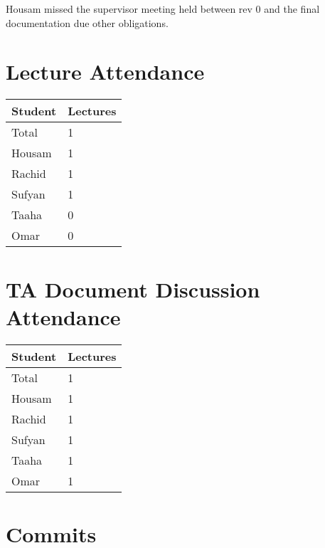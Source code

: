 \documentclass{article}
\begin{document}
Housam missed the supervisor meeting held between rev 0 and the final documentation due other obligations.

\section{Lecture Attendance}


\begin{table}[H]
\centering
\begin{tabular}{ll}
\toprule
\textbf{Student} & \textbf{Lectures}\\
\midrule
Total & 1\\
Housam & 1 \\
Rachid & 1 \\
Sufyan & 1 \\
Taaha & 0 \\
Omar & 0 \\
\bottomrule
\end{tabular}
\end{table}


\section{TA Document Discussion Attendance}


\begin{table}[H]
\centering
\begin{tabular}{ll}
\toprule
\textbf{Student} & \textbf{Lectures}\\
\midrule
Total & 1\\
Housam & 1 \\
Rachid & 1 \\
Sufyan & 1 \\
Taaha & 1 \\
Omar & 1 \\
\bottomrule
\end{tabular}
\end{table}


\section{Commits}
\end{document}

